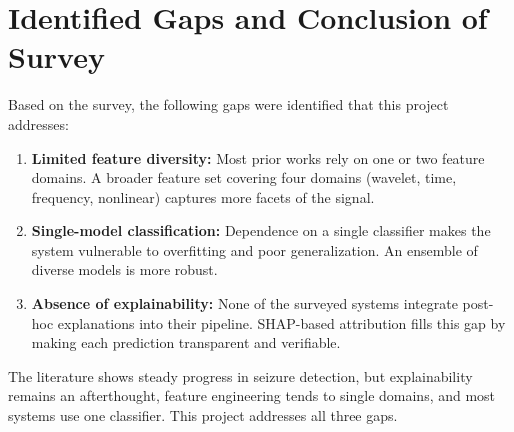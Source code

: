 \begin{table}[htbp]
\centering
\caption{Comparison of related works on EEG-based seizure detection.}
\label{tab:litcomp}
\renewcommand{\arraystretch}{1.3}
\end{table}

\section{Identified Gaps and Conclusion of Survey}

Based on the survey, the following gaps were identified that this project addresses:

\begin{enumerate}
    \item \textbf{Limited feature diversity:} Most prior works rely on one or two feature domains. A broader feature set covering four domains (wavelet, time, frequency, nonlinear) captures more facets of the signal.

    \item \textbf{Single-model classification:} Dependence on a single classifier makes the system vulnerable to overfitting and poor generalization. An ensemble of diverse models is more robust.

    \item \textbf{Absence of explainability:} None of the surveyed systems integrate post-hoc explanations into their pipeline. SHAP-based attribution fills this gap by making each prediction transparent and verifiable.
\end{enumerate}

The literature shows steady progress in seizure detection, but explainability remains an afterthought, feature engineering tends to single domains, and most systems use one classifier. This project addresses all three gaps.
